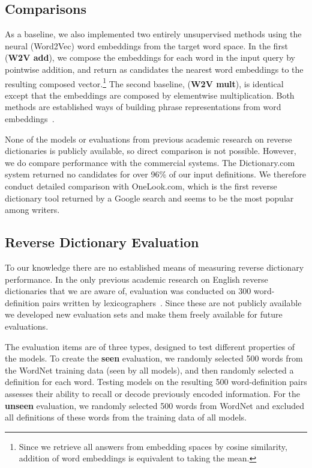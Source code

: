 \subsection{Comparisons}

As a baseline, we also implemented two entirely unsupervised methods using the neural (Word2Vec) word embeddings from the target word space. In the first ({\bf W2V add}), we compose the embeddings for each word in the input query by pointwise addition, and return as candidates the nearest word embeddings to the resulting composed vector.\footnote{Since we retrieve all answers from embedding spaces by cosine similarity, addition of word embeddings is equivalent to taking the mean.} The second baseline, ({\bf W2V mult}), is identical except that the embeddings are composed by elementwise multiplication. Both methods are established ways of building phrase representations from word embeddings~\cite{mitchell2010composition}.

None of the models or evaluations from previous academic research on reverse dictionaries is publicly available, so direct comparison is not possible. However, we do compare performance with the commercial systems. The Dictionary.com system returned no candidates for over 96\% of our input definitions. We therefore conduct detailed comparison with OneLook.com, which is the first reverse dictionary tool returned by a Google search and seems to be the most popular among writers. 

\subsection{Reverse Dictionary Evaluation}

To our knowledge there are no established means of measuring reverse dictionary performance. In the only previous academic research on English reverse dictionaries that we are aware of, evaluation was conducted on 300 word-definition pairs written by lexicographers~\cite{shaw2013building}. Since these are not publicly available we developed new evaluation sets and make them freely available for future evaluations.  

The evaluation items are of three types, designed to test different properties of the models. To create the {\bf seen} evaluation, we randomly selected 500 words from the WordNet training data (seen by all models), and then randomly selected a definition for each word. Testing models on the resulting 500 word-definition pairs assesses their ability to recall or decode previously encoded information. For the {\bf unseen} evaluation, we randomly selected 500 words from WordNet and excluded all definitions of these words from the training data of all models. 

